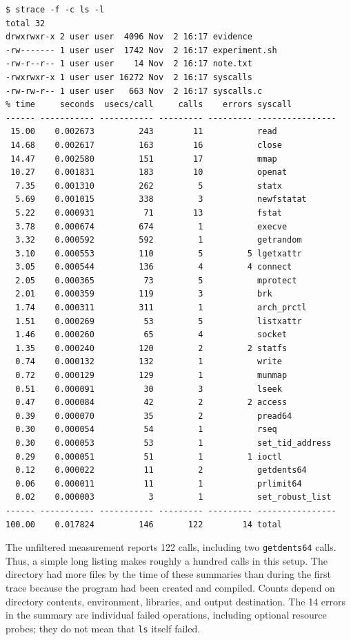 \documentclass[12pt,a4paper]{article}
\begin{document}
\begin{lstlisting}[caption={Unfiltered summary of system calls made by ls}]
$ strace -f -c ls -l
total 32
drwxrwxr-x 2 user user  4096 Nov  2 16:17 evidence
-rw------- 1 user user  1742 Nov  2 16:17 experiment.sh
-rw-r--r-- 1 user user    14 Nov  2 16:17 note.txt
-rwxrwxr-x 1 user user 16272 Nov  2 16:17 syscalls
-rw-rw-r-- 1 user user   663 Nov  2 16:17 syscalls.c
% time     seconds  usecs/call     calls    errors syscall
------ ----------- ----------- --------- --------- ----------------
 15.00    0.002673         243        11           read
 14.68    0.002617         163        16           close
 14.47    0.002580         151        17           mmap
 10.27    0.001831         183        10           openat
  7.35    0.001310         262         5           statx
  5.69    0.001015         338         3           newfstatat
  5.22    0.000931          71        13           fstat
  3.78    0.000674         674         1           execve
  3.32    0.000592         592         1           getrandom
  3.10    0.000553         110         5         5 lgetxattr
  3.05    0.000544         136         4         4 connect
  2.05    0.000365          73         5           mprotect
  2.01    0.000359         119         3           brk
  1.74    0.000311         311         1           arch_prctl
  1.51    0.000269          53         5           listxattr
  1.46    0.000260          65         4           socket
  1.35    0.000240         120         2         2 statfs
  0.74    0.000132         132         1           write
  0.72    0.000129         129         1           munmap
  0.51    0.000091          30         3           lseek
  0.47    0.000084          42         2         2 access
  0.39    0.000070          35         2           pread64
  0.30    0.000054          54         1           rseq
  0.30    0.000053          53         1           set_tid_address
  0.29    0.000051          51         1         1 ioctl
  0.12    0.000022          11         2           getdents64
  0.06    0.000011          11         1           prlimit64
  0.02    0.000003           3         1           set_robust_list
------ ----------- ----------- --------- --------- ----------------
100.00    0.017824         146       122        14 total
\end{lstlisting}

The unfiltered measurement reports 122 calls, including two \texttt{getdents64}
calls. Thus, a simple long listing makes roughly a hundred calls in this setup.
The directory had more files by the time of these summaries than during the first
trace because the program had been created and compiled. Counts depend on directory
contents, environment, libraries, and output destination. The 14 errors in the
summary are individual failed operations, including optional resource probes;
they do not mean that \texttt{ls} itself failed.
\end{document}
